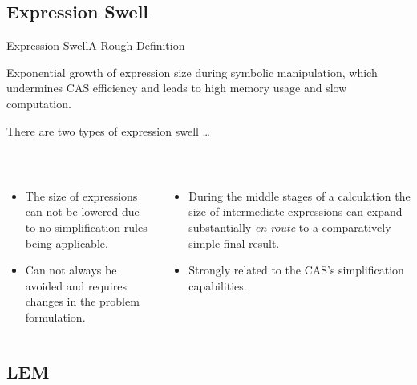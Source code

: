 \subsection{Expression Swell}

\begin{frame}{Expression Swell}{A Rough Definition}
  \begin{bbox}
    Exponential growth of expression size during symbolic manipulation, which undermines \ac{CAS} efficiency and leads to high memory usage and slow computation.
  \end{bbox}
  \vspace{0.75em}
  There are two types of expression swell \dots
  \vspace{0.75em}
  \begin{columns}
    \begin{column}[t]{0.5\textwidth}
       \\
      \begin{itemize}\small
        \item The size of expressions can not be lowered due to no simplification rules being applicable.
        \item Can not always be avoided and requires changes in the problem formulation.
      \end{itemize}
    \end{column}
    \begin{column}[t]{0.5\textwidth}
       \\
      \begin{itemize}\small
        \item During the middle stages of a calculation the size of intermediate expressions can expand substantially \emph{en route} to a comparatively simple final result.
        \item Strongly related to the \ac{CAS}'s simplification capabilities.
      \end{itemize}
    \end{column}
  \end{columns}
\end{frame}

\subsection{\acl{LEM}}

